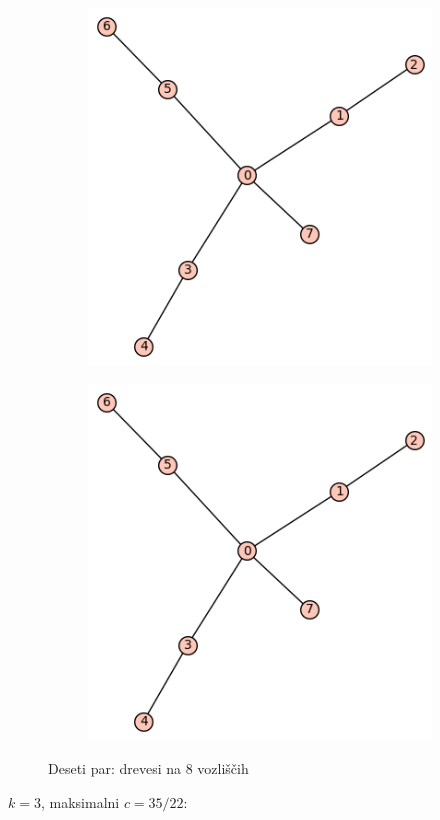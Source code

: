 \documentclass[12pt, a4paper]{article}
\begin{document}
\begin{center}
\begin{center}
\begin{figure}[!htb]
\centering
\begin{subfigure}{0.5\textwidth}
  \centering
  \includegraphics[width=0.4\linewidth]{t-44}
\end{subfigure}%
\begin{subfigure}{0.5\textwidth}
  \centering
  \includegraphics[width=0.5\linewidth]{t-44}
\end{subfigure}
\caption{Deseti par: drevesi na 8 vozliščih}
\label{fig:test}
\end{figure}
\end{center}


$k=3$, maksimalni $c=35/22$:\\


\end{center}
\end{document}
